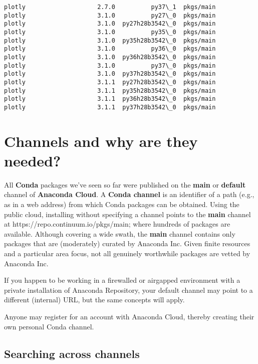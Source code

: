 \documentclass[11pt]{article}
\begin{document}
\begin{Verbatim}[commandchars=\\\{\}]
plotly                    2.7.0          py37\_1  pkgs/main           
plotly                    3.1.0          py27\_0  pkgs/main           
plotly                    3.1.0  py27h28b3542\_0  pkgs/main           
plotly                    3.1.0          py35\_0  pkgs/main           
plotly                    3.1.0  py35h28b3542\_0  pkgs/main           
plotly                    3.1.0          py36\_0  pkgs/main           
plotly                    3.1.0  py36h28b3542\_0  pkgs/main           
plotly                    3.1.0          py37\_0  pkgs/main           
plotly                    3.1.0  py37h28b3542\_0  pkgs/main           
plotly                    3.1.1  py27h28b3542\_0  pkgs/main           
plotly                    3.1.1  py35h28b3542\_0  pkgs/main           
plotly                    3.1.1  py36h28b3542\_0  pkgs/main           
plotly                    3.1.1  py37h28b3542\_0  pkgs/main           

    \end{Verbatim}

    \section{Channels and why are they
needed?}\label{channels-and-why-are-they-needed}

All \textbf{Conda} packages we've seen so far were published on the
\textbf{main} or \textbf{default} channel of \textbf{Anaconda Cloud}. A
\textbf{Conda channel} is an identifier of a path (e.g., as in a web
address) from which Conda packages can be obtained. Using the public
cloud, installing without specifying a channel points to the
\textbf{main} channel at https://repo.continuum.io/pkgs/main; where
hundreds of packages are available. Although covering a wide swath, the
\textbf{main} channel contains only packages that are (moderately)
curated by Anaconda Inc. Given finite resources and a particular area
focus, not all genuinely worthwhile packages are vetted by Anaconda Inc.

If you happen to be working in a firewalled or airgapped environment
with a private installation of Anaconda Repository, your default channel
may point to a different (internal) URL, but the same concepts will
apply.

Anyone may register for an account with Anaconda Cloud, thereby creating
their own personal Conda channel.

    \subsection{Searching across channels}\label{searching-across-channels}
\end{document}
